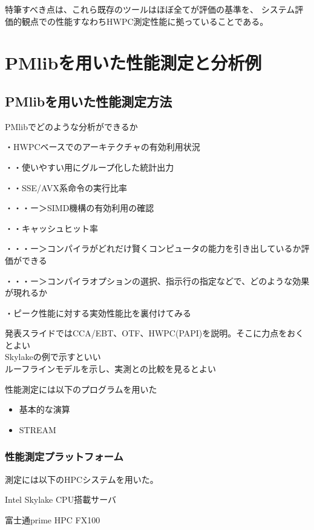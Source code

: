 \documentclass[submit,techrep,noauthor]{ipsj}
\begin{document}
特筆すべき点は、これら既存のツールはほぼ全てが評価の基準を、
システム評価的観点での性能すなわちHWPC測定性能に拠っていることである。


\section{PMlibを用いた性能測定と分析例}

\subsection{PMlibを用いた性能測定方法}

{ \color{blue} \par
PMlibでどのような分析ができるか \par
・HWPCベースでのアーキテクチャの有効利用状況 \par
・・使いやすい用にグループ化した統計出力 \par
・・SSE/AVX系命令の実行比率 \par
・・・ー＞SIMD機構の有効利用の確認 \par
・・キャッシュヒット率 \par
・・・ー＞コンパイラがどれだけ賢くコンピュータの能力を引き出しているか評価ができる \par
・・・ー＞コンパイラオプションの選択、指示行の指定などで、どのような効果が現れるか \par
・ピーク性能に対する実効性能比を裏付けてみる \par

発表スライドではCCA/EBT、OTF、HWPC(PAPI)を説明。そこに力点をおくとよい\\
Skylakeの例で示すといい\\
ルーフラインモデルを示し、実測との比較を見るとよい\\
} \par

性能測定には以下のプログラムを用いた
\begin{itemize}
\item{基本的な演算}
\item{STREAM}
\end{itemize}


\subsubsection{性能測定プラットフォーム}

測定には以下のHPCシステムを用いた。
\begin{itemize}
{
\item Intel Skylake CPU搭載サーバ
\item 富士通prime HPC FX100
}
\end{itemize}
\end{document}
